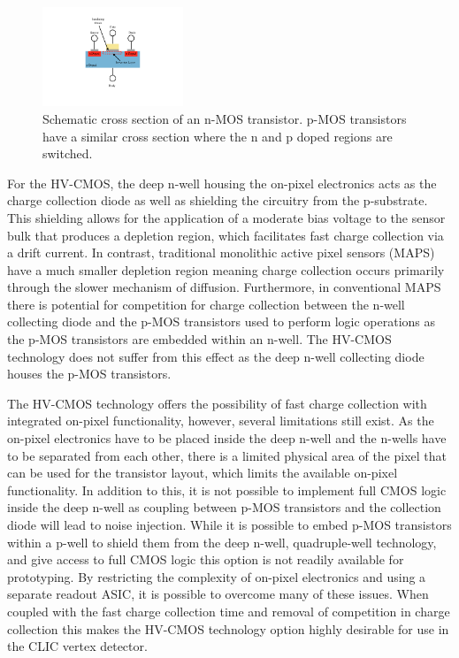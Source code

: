 \begin{figure}[h!]
\centering
\includegraphics[width=0.375\textwidth]{CLICdpVertex/Plots/FETDiagram.pdf}
\caption[Schematic cross section of an n-MOS transistor.  p-MOS transistors have a similar cross section where the n and p doped regions are switched.]{Schematic cross section of an n-MOS transistor.  p-MOS transistors have a similar cross section where the n and p doped regions are switched.}
\label{fig:nmos}
\end{figure}

For the HV-CMOS, the deep n-well housing the on-pixel electronics acts as the charge collection diode as well as shielding the circuitry from the p-substrate.  This shielding allows for the application of a moderate bias voltage to the sensor bulk that produces a depletion region, which facilitates fast charge collection via a drift current.  In contrast, traditional monolithic active pixel sensors (MAPS) have a much smaller depletion region meaning charge collection occurs primarily through the slower mechanism of diffusion.  Furthermore, in conventional MAPS there is potential for competition for charge collection between the n-well collecting diode and the p-MOS transistors used to perform logic operations as the p-MOS transistors are embedded within an n-well.  The HV-CMOS technology does not suffer from this effect as the deep n-well collecting diode houses the p-MOS transistors.

The HV-CMOS technology offers the possibility of fast charge collection with integrated on-pixel functionality, however, several limitations still exist.  As the on-pixel electronics have to be placed inside the deep n-well and the n-wells have to be separated from each other, there is a limited physical area of the pixel that can be used for the transistor layout, which limits the available on-pixel functionality.  In addition to this, it is not possible to implement full CMOS logic inside the deep n-well as coupling between p-MOS transistors and the collection diode will lead to noise injection.  While it is possible to embed p-MOS transistors within a p-well to shield them from the deep n-well, quadruple-well technology, and give access to full CMOS logic this option is not readily available for prototyping.  By restricting the complexity of on-pixel electronics and using a separate readout ASIC, it is possible to overcome many of these issues.  When coupled with the fast charge collection time and removal of competition in charge collection this makes the HV-CMOS technology option highly desirable for use in the CLIC vertex detector.

